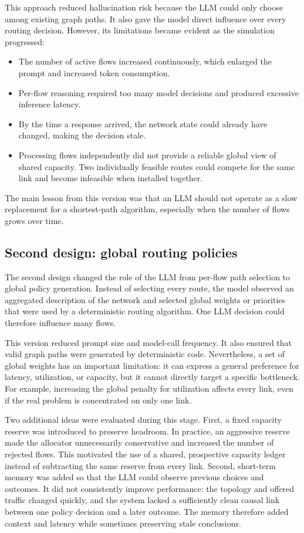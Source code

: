 This approach reduced hallucination risk because the LLM could only choose among
existing graph paths. It also gave the model direct influence over every routing
decision. However, its limitations became evident as the simulation progressed:

\begin{itemize}
    \item The number of active flows increased continuously, which enlarged the prompt
    and increased token consumption.
    \item Per-flow reasoning required too many model decisions and produced excessive
    inference latency.
    \item By the time a response arrived, the network state could already have changed,
    making the decision stale.
    \item Processing flows independently did not provide a reliable global view of
    shared capacity. Two individually feasible routes could compete for the same link
    and become infeasible when installed together.
\end{itemize}

The main lesson from this version was that an LLM should not operate as a slow
replacement for a shortest-path algorithm, especially when the number of flows grows
over time.

\subsection{Second design: global routing policies}

The second design changed the role of the LLM from per-flow path selection to global
policy generation. Instead of selecting every route, the model observed an aggregated
description of the network and selected global weights or priorities that were used by
a deterministic routing algorithm. One LLM decision could therefore influence many
flows.

This version reduced prompt size and model-call frequency. It also ensured that valid
graph paths were generated by deterministic code. Nevertheless, a set of global
weights has an important limitation: it can express a general preference for latency,
utilization, or capacity, but it cannot directly target a specific bottleneck. For
example, increasing the global penalty for utilization affects every link, even if the
real problem is concentrated on only one link.

Two additional ideas were evaluated during this stage. First, a fixed capacity reserve
was introduced to preserve headroom. In practice, an aggressive reserve made the
allocator unnecessarily conservative and increased the number of rejected flows. This
motivated the use of a shared, prospective capacity ledger instead of subtracting the
same reserve from every link. Second, short-term memory was added so that the LLM could
observe previous choices and outcomes. It did not consistently improve performance:
the topology and offered traffic changed quickly, and the system lacked a sufficiently
clean causal link between one policy decision and a later outcome. The memory therefore
added context and latency while sometimes preserving stale conclusions.

